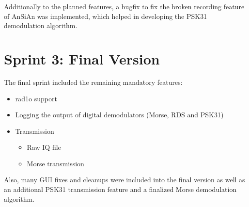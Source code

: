 Additionally to the planned features, a bugfix to fix the
broken recording feature of \ac{AnSiAn} was implemented, which helped in developing the
PSK31 demodulation algorithm.

\section{Sprint 3: Final Version}

The final sprint included the remaining mandatory features:
\begin{itemize}
	\item rad1o support
	\item Logging the output of digital demodulators (Morse, RDS and PSK31)
	\item Transmission
		\begin{itemize}
			\item Raw IQ file
			\item Morse transmission
		\end{itemize}
\end{itemize}

Also, many \ac{GUI} fixes and cleanups were included into the final version
as well as an additional PSK31 transmission feature and a finalized
Morse demodulation algorithm.


